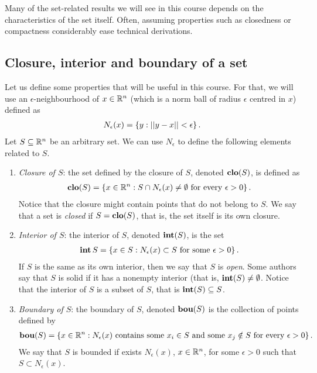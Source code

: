 Many of the set-related results we will see in this course depends on the characteristics of the set itself. Often, assuming properties such as closedness or compactness considerably ease technical derivations. 


\subsection{Closure, interior and boundary of a set}


Let us define some properties that will be useful in this course. For that, we will use an $\epsilon$-neighbourhood of $x \in \mathbb{R}^n$ (which is a norm ball of radius $\epsilon$ centred in $x$) defined as
%
\begin{align*}
    N_\epsilon(x) = \left\{ y : ||y - x|| < \epsilon \right \}.
\end{align*}
%
Let $S \subseteq \mathbb{R}^n$ be an arbitrary set. We can use $N_\epsilon$ to define the following elements related to $S$.  
\begin{enumerate}
\item \emph{Closure of $S$}: the set defined by the closure of $S$, denoted $\mathop{\bf clo}(S)$, is defined as 
%
\begin{align*}
\mathop{\bf clo}(S) = \left\{ x \in \mathbb{R}^n : S \cap N_\epsilon(x) \neq \emptyset \text{ for every } \epsilon > 0 \right \}. 
\end{align*}
%
Notice that the closure might contain points that do not belong to $S$. We say that a set is \emph{closed} if $S = \mathop{\bf clo}(S)$, that is, the set itself is its own closure. 
%
\item \emph{Interior of $S$}: the interior of $S$, denoted $\mathop{\bf int}(S)$, is the set
\begin{align*}
\mathop{\bf int}{S} = \left\{ x \in S : N_\epsilon(x) \subset S \text{ for some } \epsilon > 0 \right \}.
\end{align*}
%
If $S$ is the same as its own interior, then we say that $S$ is \emph{open}. Some authors say that $S$ is solid if it has a nonempty interior (that is, $\mathop{\bf int}(S) \neq \emptyset$. Notice that the interior of $S$ is a subset of $S$, that is $\mathop{\bf int}(S) \subseteq S$.
%
\item \emph{Boundary of $S$}: the boundary of $S$, denoted $\mathop{\bf bou}(S)$ is the collection of points defined by
%
\begin{align*}
\mathop{\bf bou}(S) = \left\{ x \in \mathbb{R}^n : N_\epsilon(x) \text{ contains some } x_i \in S \text{ and some } x_j \notin S \text{ for every } \epsilon > 0 \right \}.
\end{align*}
%
We say that $S$ is bounded if exists $N_\epsilon(x)$, $x \in \mathbb{R}^n$, for some $\epsilon > 0$ such that $S \subset N_\epsilon(x)$. 
\end{enumerate}

